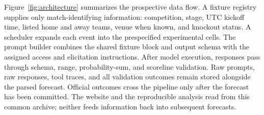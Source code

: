Figure~\ref{fig:architecture} summarizes the prospective data flow. A fixture registry supplies only
match-identifying information: competition, stage, UTC kickoff time, listed home and away teams,
venue when known, and knockout status. A scheduler expands each event into the prespecified
experimental cells. The prompt builder combines the shared fixture block and output schema with the
assigned access and elicitation instructions. After model execution, responses pass through schema,
range, probability-sum, and scoreline validation. Raw prompts, raw responses, tool traces, and all
validation outcomes remain stored alongside the parsed forecast. Official outcomes cross the
pipeline only after the forecast has been committed. The website and the reproducible analysis read
from this common archive; neither feeds information back into subsequent forecasts.

